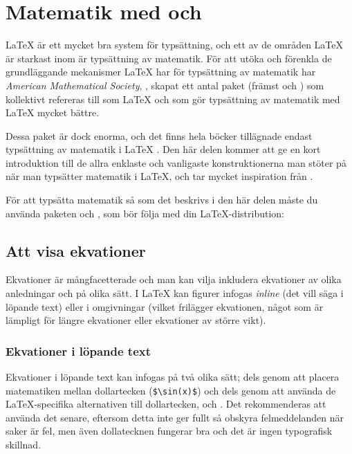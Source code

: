 \documentclass[lang=sv,ptsize=10pt,font=none,nomath,titles=bf,../../a4.tex]{subfiles}
\begin{document}
\section{Matematik med  och \texorpdfstring{\AmS}{AMS}}\label{sec:3}
\LaTeX{} är ett mycket bra system för typsättning, och ett av de områden
\LaTeX{} är starkast inom är typsättning av matematik. För att utöka och
förenkla de grundläggande mekanismer \LaTeX{} har för typsättning av 
matematik har \textit{American Mathematical Society}, \AmS, skapat ett 
antal paket (främst  och ) som kollektivt 
refereras till som \AmS\LaTeX{} och som gör typsättning av matematik med 
\LaTeX{} mycket bättre.

Dessa paket är dock enorma, och det finns hela böcker tillägnade endast
typsättning av matematik i \LaTeX{} \parencite[till exempel][som för övrigt är en 
mycket bra referens att ha till hands när man typsätter matematik i 
\LaTeX]{Voss10}.
Den här delen kommer att ge en kort introduktion till de allra enklaste
och vanligaste konstruktionerna man stöter på när man typsätter matematik
i \LaTeX, och tar mycket inspiration från \textcite{Voss10}.

För att typsätta matematik så som det beskrivs i den här delen måste du
använda paketen  och , som bör följa med din
\LaTeX-distribution:
\begin{latexcode}
\usepackage{amsmath}
\usepackage{amssymb}
\end{latexcode}

\subsection{Att visa ekvationer}
Ekvationer är mångfacetterade och man kan vilja inkludera ekvationer av
olika anledningar och på olika sätt. I \LaTeX{} kan figurer infogas
\emph{inline} (det vill säga i löpande text) eller i omgivningar (vilket
frilägger ekvationen, något som är lämpligt för längre ekvationer eller
ekvationer av större vikt).

\subsubsection{Ekvationer i löpande text}
Ekvationer i löpande text kan infogas på två olika sätt; dels genom att
placera matematiken mellan dollartecken (\verb|$\sin(x)$|) och dels genom
att använda de \LaTeX-specifika alternativen till dollartecken, \cmd{(}
och \cmd{)}. Det rekommenderas att använda det senare, eftersom detta inte
ger fullt så obskyra felmeddelanden när saker är fel, men även
dollatecknen fungerar bra och det är ingen typografisk skillnad.
\end{document}
